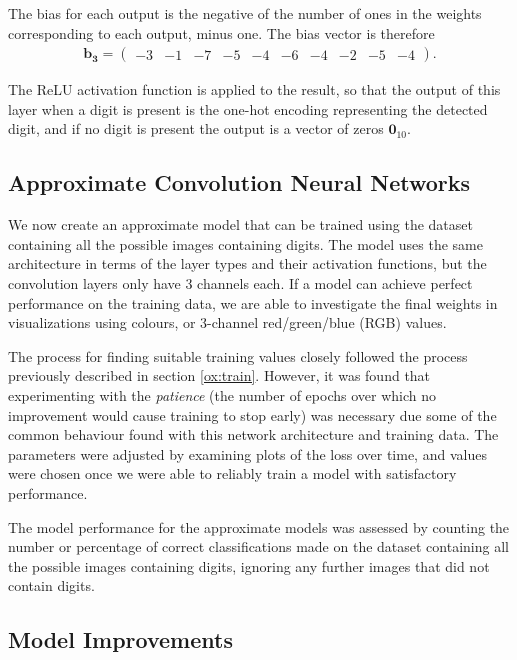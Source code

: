 \documentclass{somasmsc}
\begin{document}
The bias for each output is the negative of the number of ones in the weights corresponding to each output, minus one. The bias vector is therefore
\begin{align*}
    \pmb{b_3} =
    \begin{pmatrix}
        -3 & -1 & -7 & -5 & -4 & -6 & -4 & -2 & -5 & -4
    \end{pmatrix}.
\end{align*}

The ReLU activation function is applied to the result, so that the output of this layer when a digit is present is the one-hot encoding representing the detected digit, and if no digit is present the output is a vector of zeros $\mathbf{0}_{10}$.

\subsection{Approximate Convolution Neural Networks}

We now create an approximate model that can be trained using the dataset containing all the possible images containing digits. The model uses the same architecture in terms of the layer types and their activation functions, but the convolution layers only have 3 channels each. If a model can achieve perfect performance on the training data, we are able to investigate the final weights in visualizations using colours, or 3-channel red/green/blue (RGB) values.

The process for finding suitable training values closely followed the process previously described in section \ref{ox:train}. However, it was found that experimenting with the \textit{patience} (the number of epochs over which no improvement would cause training to stop early) was necessary due some of the common behaviour found with this network architecture and training data. The parameters were adjusted by examining plots of the loss over time, and values were chosen once we were able to reliably train a model with satisfactory performance.

The model performance for the approximate models was assessed by counting the number or percentage of correct classifications made on the dataset containing all the possible images containing digits, ignoring any further images that did not contain digits.

\subsection{Model Improvements}
\end{document}
